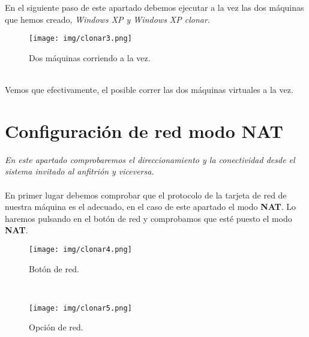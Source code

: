 \documentclass[12pt]{article}
\begin{document}
      \newpage

      En el siguiente paso de este apartado debemos ejecutar a la vez las dos máquinas que hemos creado, \textit{Windows XP y Windows XP clonar}.
      \begin{figure}[h]
        \centering
        \texttt{[image: img/clonar3.png]}
        \caption{Dos máquinas corriendo a la vez.}
        \label{Clonado3}
      \end{figure}
      \\
      Vemos que efectivamente, el posible correr las dos máquinas virtuales a la vez.

      \newpage

    \section{Configuración de red modo NAT}
      \textit{En este apartado comprobaremos el direccionamiento y la conectividad desde el sistema invitado al anfitrión y viceversa.}
      \\\\
      En primer lugar debemos comprobar que el protocolo de la tarjeta de red de nuestra máquina es el adecuado, en el caso de 
      este apartado el modo \textbf{NAT}. Lo haremos pulsando en el botón de red y comprobamos que esté puesto el modo \textbf{NAT}.
      \\
      \begin{figure}[h]
        \centering
        \texttt{[image: img/clonar4.png]}
        \caption{Botón de red.}
        \label{Nat}
      \end{figure}
      \\
      \begin{figure}[h]
        \centering
        \texttt{[image: img/clonar5.png]}
        \caption{Opción de red.}
        \label{Nat2}
      \end{figure}

      \newpage
\end{document}
